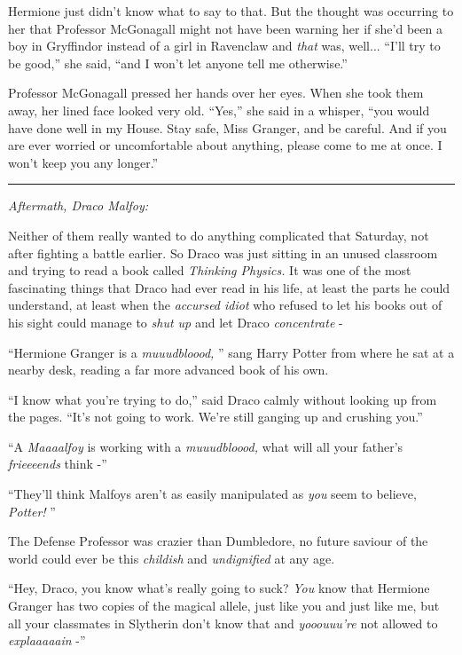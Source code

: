 Hermione just didn't know what to say to that. But the thought was
occurring to her that Professor McGonagall might not have been warning
her if she'd been a boy in Gryffindor instead of a girl in Ravenclaw and
\emph{that} was, well... ``I'll try to be good,'' she said, ``and I
won't let anyone tell me otherwise.''

Professor McGonagall pressed her hands over her eyes. When she took them
away, her lined face looked very old. ``Yes,'' she said in a whisper,
``you would have done well in my House. Stay safe, Miss Granger, and be
careful. And if you are ever worried or uncomfortable about anything,
please come to me at once. I won't keep you any longer.''

\begin{center}\rule{3in}{0.4pt}\end{center}

\emph{Aftermath, Draco Malfoy:}

Neither of them really wanted to do anything complicated that Saturday,
not after fighting a battle earlier. So Draco was just sitting in an
unused classroom and trying to read a book called \emph{Thinking
Physics.} It was one of the most fascinating things that Draco had ever
read in his life, at least the parts he could understand, at least when
the \emph{accursed idiot} who refused to let his books out of his sight
could manage to \emph{shut up} and let Draco \emph{concentrate} -

``Hermione Granger is a \emph{muuudbloood,} '' sang Harry Potter from
where he sat at a nearby desk, reading a far more advanced book of his
own.

``I know what you're trying to do,'' said Draco calmly without looking
up from the pages. ``It's not going to work. We're still ganging up and
crushing you.''

``A \emph{Maaaalfoy} is working with a \emph{muuudbloood,} what will all
your father's \emph{frieeeends} think -''

``They'll think Malfoys aren't as easily manipulated as \emph{you} seem
to believe, \emph{Potter!} ''

The Defense Professor was crazier than Dumbledore, no future saviour of
the world could ever be this \emph{childish} and \emph{undignified} at
any age.

``Hey, Draco, you know what's really going to suck? \emph{You} know that
Hermione Granger has two copies of the magical allele, just like you and
just like me, but all your classmates in Slytherin don't know that and
\emph{yooouuu're} not allowed to \emph{explaaaaain} -''

